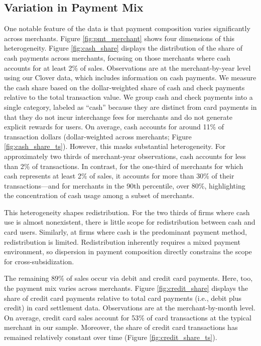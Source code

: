 \documentclass[11pt,english]{article}
\theoremstyle{remark}
\begin{document}
\subsection{Variation in Payment Mix\label{subsec:payment-mix}}

One notable feature of the data is that payment composition varies significantly across merchants. Figure \ref{fig:pmt_merchant} shows four dimensions of this heterogeneity.
Figure \ref{fig:cash_share} displays the distribution of the share of cash payments across merchants, focusing on those merchants where cash accounts for at least 2\% of sales.
Observations are at the merchant-by-year level using our Clover data, which includes information on cash payments.
We measure the cash share based on the dollar-weighted share of cash and check payments relative to the total transaction value.
We group cash and check payments into a single category, labeled as ``cash'' because they are distinct from card payments in that they do not incur interchange fees for merchants and do not generate explicit rewards for users.
On average, cash accounts for around 11\% of transaction dollars (dollar-weighted across merchants; Figure \ref{fig:cash_share_ts}).
However, this masks substantial heterogeneity.
For approximately two thirds of merchant-year observations, cash accounts for less than 2\% of transactions.
In contrast, for the one-third of merchants for which cash represents at least 2\% of sales, it accounts for more than 30\% of their transactions---and for merchants in the 90th percentile, over 80\%, highlighting the concentration of cash usage among a subset of merchants.

This heterogeneity shapes redistribution.
For the two thirds of firms where cash use is almost nonexistent, there is little scope for redistribution between cash and card users.
Similarly, at firms where cash is the predominant payment method, redistribution is limited.
Redistribution inherently requires a mixed payment environment, so dispersion in payment composition directly constrains the scope for cross-subsidization.

The remaining 89\% of sales occur via debit and credit card payments.
Here, too, the payment mix varies across merchants.
Figure \ref{fig:credit_share} displays the share of credit card payments relative to total card payments (i.e., debit plus credit) in card settlement data.
Observations are at the merchant-by-month level.
On average, credit card sales account for 53\% of card transactions at the typical merchant in our sample.
Moreover, the share of credit card transactions has remained relatively constant over time (Figure \ref{fig:credit_share_ts}).
\end{document}
